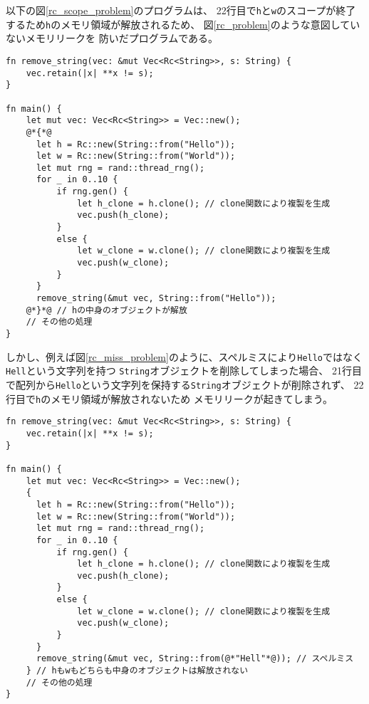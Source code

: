 \documentclass{sumiilab-paper}
\theoremstyle{mystyle}
\numberwithin{definition}{chapter} %
\begin{document}
以下の図\ref{rc_scope_problem}のプログラムは、
22行目で\texttt{h}と\texttt{w}のスコープが終了するため\texttt{h}のメモリ領域が解放されるため、
図\ref{rc_problem}のような意図していないメモリリークを
防いだプログラムである。
\begin{lstlisting}[caption=メモリリークを防いだ例, 
  label=rc_scope_problem, captionpos=b]
fn remove_string(vec: &mut Vec<Rc<String>>, s: String) {
    vec.retain(|x| **x != s);
}
  
fn main() {
    let mut vec: Vec<Rc<String>> = Vec::new();
    @*{*@
      let h = Rc::new(String::from("Hello"));
      let w = Rc::new(String::from("World"));
      let mut rng = rand::thread_rng();
      for _ in 0..10 {
          if rng.gen() {
              let h_clone = h.clone(); // clone関数により複製を生成
              vec.push(h_clone);
          }
          else {
              let w_clone = w.clone(); // clone関数により複製を生成
              vec.push(w_clone);
          }
      } 
      remove_string(&mut vec, String::from("Hello"));
    @*}*@ // hの中身のオブジェクトが解放
    // その他の処理
}
\end{lstlisting}
しかし、例えば図\ref{rc_miss_problem}のように、スペルミスにより\texttt{Hello}ではなく\texttt{Hell}という文字列を持つ
\texttt{String}オブジェクトを削除してしまった場合、
21行目で配列から\texttt{Hello}という文字列を保持する\texttt{String}オブジェクトが削除されず、
22行目で\texttt{h}のメモリ領域が解放されないため
メモリリークが起きてしまう。
\begin{lstlisting}[caption=ユーザのミスによるメモリリーク, 
  label=rc_miss_problem, captionpos=b]
fn remove_string(vec: &mut Vec<Rc<String>>, s: String) {
    vec.retain(|x| **x != s);
}
  
fn main() {
    let mut vec: Vec<Rc<String>> = Vec::new();
    {
      let h = Rc::new(String::from("Hello"));
      let w = Rc::new(String::from("World"));
      let mut rng = rand::thread_rng();
      for _ in 0..10 {
          if rng.gen() {
              let h_clone = h.clone(); // clone関数により複製を生成
              vec.push(h_clone);
          }
          else {
              let w_clone = w.clone(); // clone関数により複製を生成
              vec.push(w_clone);
          }
      }
      remove_string(&mut vec, String::from(@*"Hell"*@)); // スペルミス
    } // hもwもどちらも中身のオブジェクトは解放されない
    // その他の処理
}
\end{lstlisting}
\end{document}
